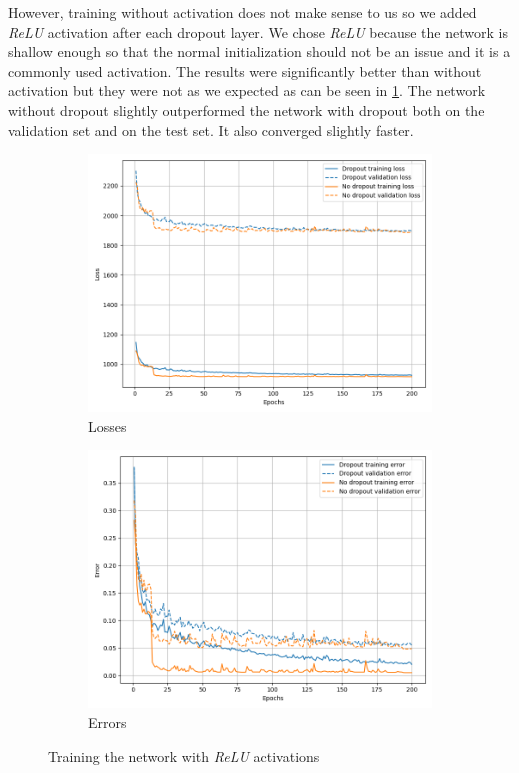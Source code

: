 \documentclass[a4paper,11pt]{article}
\begin{document}
However, training without activation does not make sense to us so we added \textit{ReLU} activation after each dropout layer.
We chose \textit{ReLU} because the network is shallow enough so that the normal initialization should not be an issue and it is a commonly used activation.
The results were significantly better than without activation but they were not as we expected as can be seen in \ref{fig:mnist_activation}.
The network without dropout slightly outperformed the network with dropout both on the validation set and on the test set.
It also converged slightly faster.

\begin{figure}[ht]
    \centering
    \hfill
    \begin{subfigure}[b]{0.45\textwidth}
        \includegraphics[width=\textwidth]{../out/03_dropout/loss.png}
        \caption{Losses}
    \end{subfigure}
    \hfill
    \begin{subfigure}[b]{0.45\textwidth}
        \includegraphics[width=\textwidth]{../out/03_dropout/error.png}
        \caption{Errors}
    \end{subfigure}
    \hfill
    \caption{Training the network with \textit{ReLU} activations}
    \label{fig:mnist_activation}
\end{figure}
\end{document}
